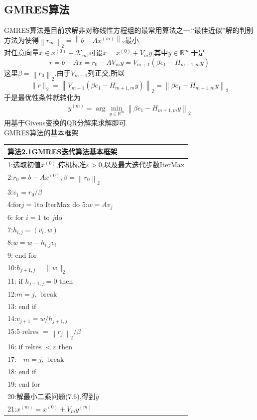 \documentclass[12pt,a4paper]{article}
\begin{document}
\subsection{GMRES算法}
GMRES算法是目前求解非对称线性方程组的最常用算法之一.“最佳近似”解的判别方法为{\color{blue}使得$\left\|r_{m}\right\|_{2}=\left\|b-A x^{(m)}\right\|_{2}$最小}\\
对任意向量$x \in x^{(0)}+\mathcal{K}_{m}$,可设$x=x^{(0)}+V_{m} y$,其中$y \in \mathbb{R}^{m}$.于是
$$
r=b-A x=r_{0}-A V_{m} y=V_{m+1}\left(\beta e_{1}-H_{m+1, m} y\right)
$$
这里$\beta=\left\|r_{0}\right\|_{2}$.由于$V_{m+1}$列正交,所以
$$
\|r\|_{2}=\left\|V_{m+1}\left(\beta e_{1}-H_{m+1, m} y\right)\right\|_{2}=\left\|\beta e_{1}-H_{m+1, m} y\right\|_{2}
$$
于是最优性条件就转化为
\begin{align*}
	y^{(m)}=\arg \min _{y \in \mathbb{R}^{m}}\left\|\beta e_{1}-H_{m+1, m} y\right\|_{2}\tag{7.6}
\end{align*}
用基于Givens变换的QR分解来求解即可.\\
GMRES算法的基本框架\\
\begin{tabular}{l}
	\hline
	{\color{blue}算法2.1}GMRES迭代算法基本框架\\
	\hline
	1:选取初值$x^{(0)}$,停机标准$\varepsilon>0$,以及最大迭代步数IterMax\\
	2:$r_{0}=b-A x^{(0)}, \beta=\left\|r_{0}\right\|_{2}$\\
	3:$v_{1}=r_{0} / \beta$\\
	4:for$j= 1$to IterMax do
	5:\qquad $w=A v_{j}$ \\
	6:\qquad $\text { for } i=1 \text { to } j \mathrm{do}$ \qquad{\color{red}\% Arnoldi过程}\\ 
	7:\qquad \qquad $h_{i, j}=\left(v_{i}, w\right)$\\ 
	8:\qquad \qquad $w=w-h_{i, j} v_{i}$\\ 
	9:\qquad $\text { end for }$\\ 
	10:\qquad $h_{j+1, j}=\|w\|_{2}$\\ 
	11:\qquad $\text { if } h_{j+1, j}=0 \text { then }$\\ 
	12:\qquad \qquad $m=j, \text { break }$\\
	13:\qquad $\text { end if }$\\ 
	14:\qquad $v_{j+1}=w / h_{j+1, j}$\\ 
	15:\qquad $5\text { relres }=\left\|r_{j}\right\|_{2} / \beta$\\ 
	16:\qquad $\text { if relres }<\varepsilon \text { then }$\\ 
	17:\qquad \qquad $\quad m=j, \text { break }$\\ 
	18:\qquad $\text { end if }$\\ 
	19:$\text { end for }$\\
	20:解最小二乘问题(7.6),得到$y$\\
	21:$x^{(m)}=x^{(0)}+V_{m} y^{(m)}$\\
	\hline
\end{tabular}
\end{document}
